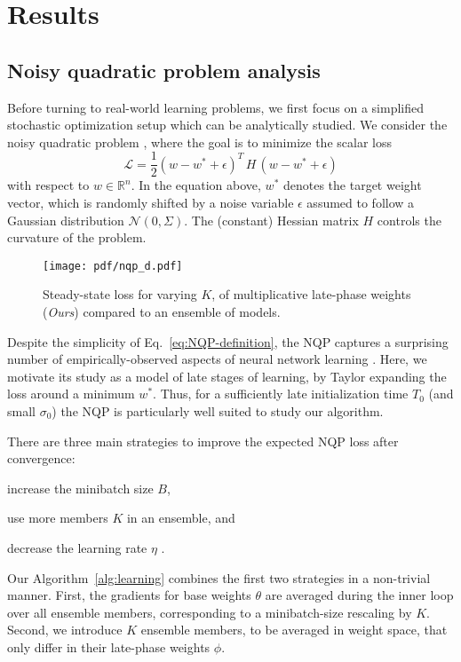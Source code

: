 \documentclass{article} \usepackage{iclr2021_conference,times}
\begin{document}
\section{Results}

\subsection{Noisy quadratic problem analysis}
Before turning to real-world learning problems, we first focus on a simplified stochastic optimization setup which can be analytically studied. We consider the noisy quadratic problem \citep[NQP;][]{schaul_no_2013,martens_second-order_2016,wu_understanding_2018,zhang_which_2019,zhang_lookahead_2019}, where the goal is to minimize the scalar loss
\begin{equation}
\label{eq:NQP-definition}
    \mathcal{L} = \frac{1}{2}(w - w^* + \epsilon)^T \, H \, (w - w^* + \epsilon)
\end{equation}
with respect to $w \in \mathbb{R}^{n}$. In the equation above, $w^*$ denotes the target weight vector, which is randomly shifted by a noise variable $\epsilon$ assumed to follow a Gaussian distribution $\mathcal{N}(0, \Sigma)$. The (constant) Hessian matrix $H$ controls the curvature of the problem.

\begin{wrapfigure}[13]{r}{0.43\textwidth}
  \vspace{-10pt}
  \begin{center}
    \texttt{[image: pdf/nqp\_d.pdf]}
  \end{center}
  \vspace{-15pt}
  \caption{Steady-state loss for varying $K$, of multiplicative late-phase weights (\emph{Ours}) compared to an ensemble of models. \label{fig:NQP-main-results}}
\end{wrapfigure}
Despite the simplicity of Eq.~\ref{eq:NQP-definition}, the NQP captures a surprising number of empirically-observed aspects of neural network learning \citep{zhang_which_2019}. Here, we motivate its study as a model of late stages of learning, by Taylor expanding the loss around a minimum $w^*$. Thus, for a sufficiently late initialization time $T_0$ (and small $\sigma_0$) the NQP is particularly well suited to study our algorithm.


There are three main strategies to improve the expected NQP loss after convergence:
\begin{enumerate*}[label=(\itshape\roman*)]
  \item increase the minibatch size $B$,
  \item use more members $K$ in an ensemble, and
  \item decrease the learning rate $\eta$ \citep{zhang_which_2019}.
\end{enumerate*}
Our Algorithm~\ref{alg:learning} combines the first two strategies in a non-trivial manner. First, the gradients for base weights $\theta$ are averaged during the inner loop over all ensemble members, corresponding to a minibatch-size rescaling by $K$. Second, we introduce $K$ ensemble members, to be averaged in weight space, that only differ in their late-phase weights $\phi$.
\end{document}
